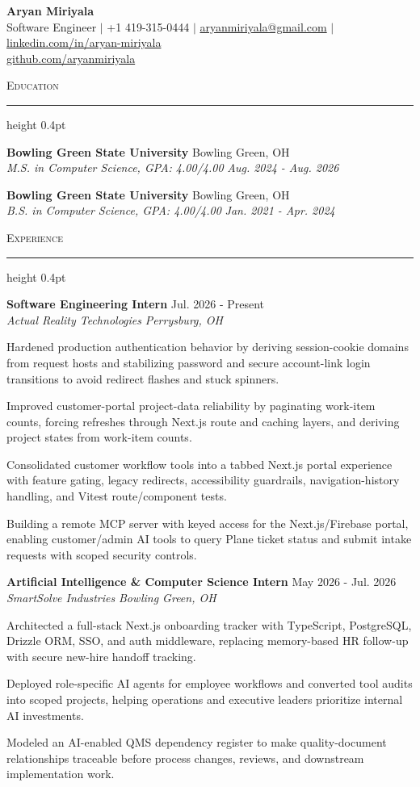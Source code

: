 \documentclass[letterpaper,11pt]{article}
\newcommand{\resumesection}[1]{%
  \par\vspace{2pt}%
  {\large\scshape #1}\par\vspace{2pt}%
  \hrule height 0.4pt\vspace{2pt}%
}
\newcommand{\resumeSubheading}[4]{
  \textbf{#1} \hfill #2\\
  \textit{#3} \hfill \textit{#4}
}
\begin{document}
\begin{center}
  {\LARGE \textbf{Aryan Miriyala}}\\[2pt]
  \small
  Software Engineer $|$ +1 419-315-0444 $|$ \href{mailto:aryanmiriyala@gmail.com}{aryanmiriyala@gmail.com} $|$ \href{https://www.linkedin.com/in/aryan-miriyala-7788a21b6/}{linkedin.com/in/aryan-miriyala}\\
  \href{https://github.com/aryanmiriyala}{github.com/aryanmiriyala}
\end{center}\vspace{-6pt}

\resumesection{Education}
\resumeSubheading
{Bowling Green State University}{Bowling Green, OH}
{M.S. in Computer Science, GPA: 4.00/4.00}{Aug. 2024 - Aug. 2026}

\resumeSubheading
{Bowling Green State University}{Bowling Green, OH}
{B.S. in Computer Science, GPA: 4.00/4.00}{Jan. 2021 - Apr. 2024}

\resumesection{Experience}
\resumeSubheading
{Software Engineering Intern}{Jul. 2026 - Present}
{Actual Reality Technologies}{Perrysburg, OH}
\begin{tightitemize}
  \item Hardened production authentication behavior by deriving session-cookie domains from request hosts and stabilizing password and secure account-link login transitions to avoid redirect flashes and stuck spinners.
  \item Improved customer-portal project-data reliability by paginating work-item counts, forcing refreshes through Next.js route and caching layers, and deriving project states from work-item counts.
  \item Consolidated customer workflow tools into a tabbed Next.js portal experience with feature gating, legacy redirects, accessibility guardrails, navigation-history handling, and Vitest route/component tests.
  \item Building a remote MCP server with keyed access for the Next.js/Firebase portal, enabling customer/admin AI tools to query Plane ticket status and submit intake requests with scoped security controls.
\end{tightitemize}

\resumeSubheading
{Artificial Intelligence \& Computer Science Intern}{May 2026 - Jul. 2026}
{SmartSolve Industries}{Bowling Green, OH}
\begin{tightitemize}
  \item Architected a full-stack Next.js onboarding tracker with TypeScript, PostgreSQL, Drizzle ORM, SSO, and auth middleware, replacing memory-based HR follow-up with secure new-hire handoff tracking.
  \item Deployed role-specific AI agents for employee workflows and converted tool audits into scoped projects, helping operations and executive leaders prioritize internal AI investments.
  \item Modeled an AI-enabled QMS dependency register to make quality-document relationships traceable before process changes, reviews, and downstream implementation work.
\end{tightitemize}
\end{document}
